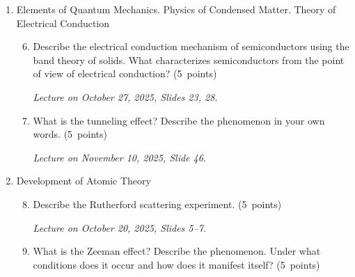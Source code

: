 \documentclass[a4paper,12pt]{letter}
\begin{document}
\begin{enumerate}[label=\Roman*.]
\begin{enumerate}[label=\arabic*.]
\textit{Lecture on October 6, 2025, Slides 29--31.}

\item Describe Planck’s hypotheses; that is, explain the significance of Planck’s radiation law.  \hfill (5~points)

\textit{Lecture on October 6, 2025, Slides 18--22.}

\end{enumerate}
  

\item Elements of Quantum Mechanics. Physics of Condensed Matter. Theory of Electrical Conduction

\begin{enumerate}[label=\arabic*.]
\setcounter{enumii}{5} %
  
\item Describe the electrical conduction mechanism of semiconductors using the band theory of solids. What characterizes semiconductors from the point of view of electrical conduction? \hfill (5~points)

\smallskip
\textit{Lecture on October 27, 2025, Slides 23, 28.}

\item What is the tunneling effect? Describe the phenomenon in your own words. \hfill (5~points)

\smallskip
\textit{Lecture on November 10, 2025, Slide 46.}

\end{enumerate}

  
\item Development of Atomic Theory

\begin{enumerate}[label=\arabic*.]
\setcounter{enumii}{7} %

\item Describe the Rutherford scattering experiment. \hfill (5~points)

\smallskip
\textit{Lecture on October 20, 2025, Slides 5--7.}

\item What is the Zeeman effect? Describe the phenomenon. Under what conditions does it occur and how does it manifest itself? \hfill (5~points)


\end{enumerate}
\end{enumerate}
\end{document}
